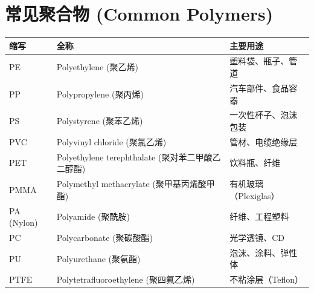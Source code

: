 \documentclass[12pt,a4paper]{ctexart}
\begin{document}
\section{常见聚合物 (Common Polymers)}

\begin{longtable}{p{2.5cm}p{6cm}p{5cm}}
\toprule
\textbf{缩写} & \textbf{全称} & \textbf{主要用途} \\
\midrule
PE & Polyethylene (聚乙烯) & 塑料袋、瓶子、管道 \\
PP & Polypropylene (聚丙烯) & 汽车部件、食品容器 \\
PS & Polystyrene (聚苯乙烯) & 一次性杯子、泡沫包装 \\
PVC & Polyvinyl chloride (聚氯乙烯) & 管材、电缆绝缘层 \\
PET & Polyethylene terephthalate (聚对苯二甲酸乙二醇酯) & 饮料瓶、纤维 \\
PMMA & Polymethyl methacrylate (聚甲基丙烯酸甲酯) & 有机玻璃（Plexiglas） \\
PA (Nylon) & Polyamide (聚酰胺) & 纤维、工程塑料 \\
PC & Polycarbonate (聚碳酸酯) & 光学透镜、CD \\
PU & Polyurethane (聚氨酯) & 泡沫、涂料、弹性体 \\
PTFE & Polytetrafluoroethylene (聚四氟乙烯) & 不粘涂层（Teflon） \\
\bottomrule
\end{longtable}
\end{document}
